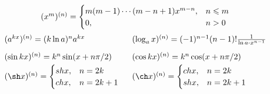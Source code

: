 \documentclass[a4paper,12pt]{article}
\begin{document}
\begin{mdframed}[innertopmargin=-.6\baselineskip,linewidth=.8pt]
\[\arraycolsep=8pt\def\arraystretch{1.8}
\begin{array}{lll}
  \multicolumn{2}{c}{%
      (x^m)^{(n)} = \begin{cases}
          m(m-1)\cdots(m-n+1)x^{m-n}, & n \leqslant m \\
          0,                          & n > 0
      \end{cases}
  }%
\\ (a^{kx})^{(n)} = (k \ln a)^n a^{kx}
&  (\log_{a}x)^{(n)} = (-1)^{n-1} (n-1)! \frac 1 {\ln a \cdot x^{n-1}}
\\ (\sin kx)^{(n)} = k^n \sin(x+n\pi/2)
&  (\cos kx)^{(n)} = k^n \cos(x+n\pi/2)
\\ (\sh x)^{(n)} = \begin{cases} sh x, & n=2k \\ ch x, & n=2k+1 \end{cases}
&  (\ch x)^{(n)} = \begin{cases} ch x, & n=2k \\ sh x, & n=2k+1 \end{cases}
\end{array}
\]
\end{mdframed}
\end{document}
